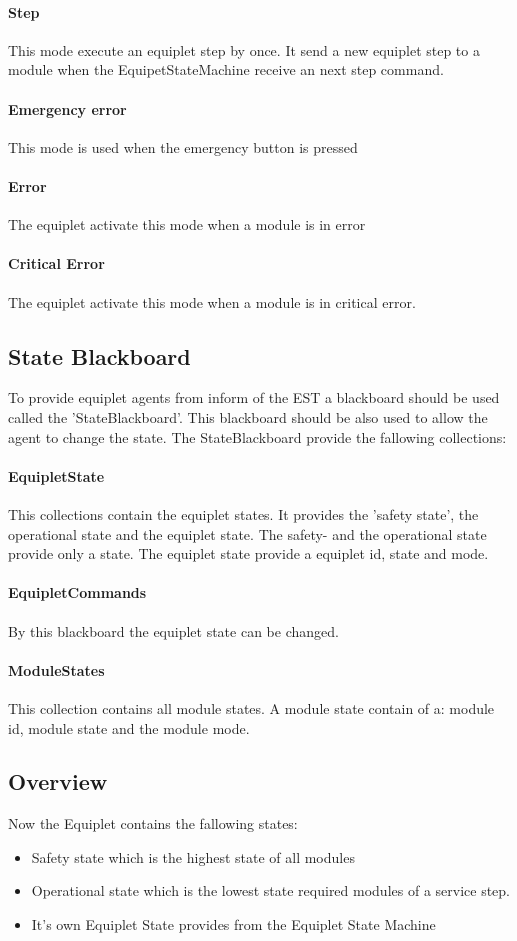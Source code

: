 \documentclass[12pt,a4paper]{report}
\begin{document}
\paragraph{Step}This mode execute an equiplet step by once. It send a new equiplet step to a module when the EquipetStateMachine receive an next step command.
\paragraph{Emergency error}This mode is used when the emergency button is pressed
\paragraph{Error}The equiplet activate this mode when a module is in error
\paragraph{Critical Error}The equiplet activate this mode when a module is in critical error.

\subsection{State Blackboard}
To provide equiplet agents from inform of the EST a blackboard should be used called the 'StateBlackboard'. This blackboard should be also used to allow the agent to change the state. The StateBlackboard provide the fallowing collections:
\paragraph{EquipletState}This collections contain the equiplet states. It provides the 'safety state', the operational state and the equiplet state. The safety- and the operational state provide only a state. The equiplet state provide a equiplet id, state and mode. 
\paragraph{EquipletCommands}By this blackboard the equiplet state can be changed.
\paragraph{ModuleStates}This collection contains all module states. A module state contain of a: module id, module state and the module mode.

\subsection{Overview}
Now the Equiplet contains the fallowing states:
\begin{itemize}
\item Safety state which is the highest state of all modules
\item Operational state which is the lowest state required modules of a service step.
\item It's own Equiplet State provides from the Equiplet State Machine
\end{itemize}
\end{document}
